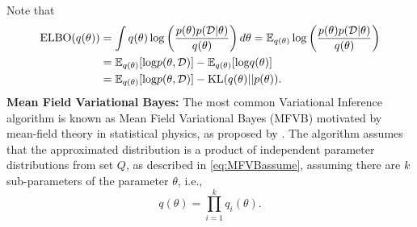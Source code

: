 \noindent Note that
\begin{equation}
	\label{eq:ELBO}	
	\begin{aligned}
		\textnormal{ELBO}(q(\theta)) &= \int q(\theta)\log\left( \frac{p(\theta)p(\mathcal{D}|\theta)}{q(\theta)} \right) d\theta = \mathop{\mathbb{E}_{q(\theta)}}\log\left( \frac{p(\theta)p(\mathcal{D}|\theta)}{q(\theta)} \right) \\
		& = \mathop{\mathbb{E}_{q(\theta)}}[\textnormal{log}p(\theta,\mathcal{D})]
		- \mathop{\mathbb{E}_{q(\theta)}}[\textnormal{log}q(\theta)]\\
		&= \mathop{\mathbb{E}_{q(\theta)}}[\textnormal{log}p(\theta,\mathcal{D})]
		- \textnormal{KL}(q(\theta)||p(\theta)).
	\end{aligned}
\end{equation}
\textbf{Mean Field Variational Bayes:}
The most common Variational Inference algorithm is known as Mean Field Variational Bayes (MFVB) motivated by mean-field theory in statistical physics, as proposed by 
\cite{parisi1988statistical}. The algorithm assumes that the approximated distribution is
a product of independent parameter distributions from set $Q$, as described in \autoref{eq:MFVBassume}, assuming there are $k$ sub-parameters of the parameter $\theta$, i.e.,
\begin{equation}
	\label{eq:MFVBassume}
	q(\theta) = \prod_{i=1}^{k} q_i(\theta).
\end{equation}

